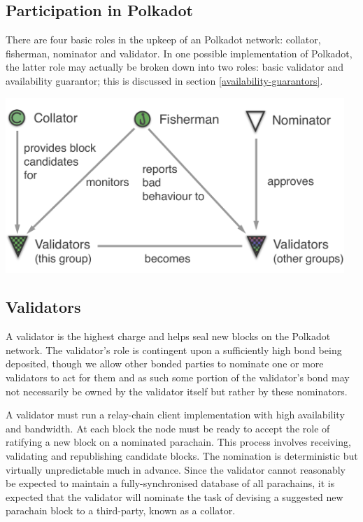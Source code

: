 \documentclass[9pt,oneside]{amsart}
\newenvironment{Figure}
  {\par\medskip\noindent\minipage{\linewidth}}
  {\endminipage\par\medskip}
\begin{document}
\begin{multicols}{2}
\section{Participation in Polkadot}
\label{participation-in-disparity}

There are four basic roles in the upkeep of an Polkadot network: collator, fisherman, nominator and validator. In one possible implementation of Polkadot, the latter role may actually be broken down into two roles: basic validator and availability guarantor; this is discussed in section \ref{availability-guarantors}.

\begin{Figure}
\medskip
\centering
\includegraphics[width=0.96\textwidth]{Interactions.pdf}
\medskip
\end{Figure}

\subsection{Validators}
\label{validators}

 A validator is the highest charge and helps seal new blocks on the Polkadot network. The validator's role is contingent upon a sufficiently high bond being deposited, though we allow other bonded parties to nominate one or more validators to act for them and as such some portion of the validator's bond may not necessarily be owned by the validator itself but rather by these nominators.

 A validator must run a relay-chain client implementation with high availability and bandwidth. At each block the node must be ready to accept the role of ratifying a new block on a nominated parachain. This process involves receiving, validating and republishing candidate blocks. The nomination is deterministic but virtually unpredictable much in advance. Since the validator cannot reasonably be expected to maintain a fully-synchronised database of all parachains, it is expected that the validator will nominate the task of devising a suggested new parachain block to a third-party, known as a collator.


\end{multicols}
\end{document}
